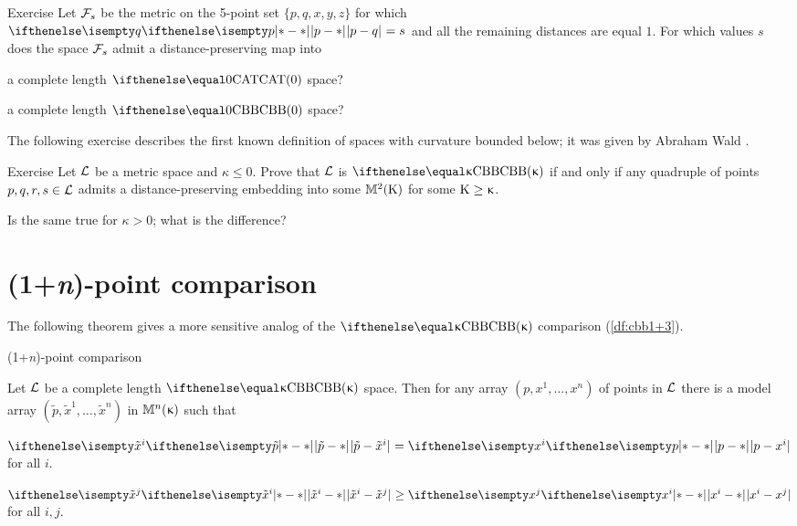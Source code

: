 \begin{thm}{Exercise}\label{ex:5-point-CBA=>CBB}
Let $\mathcal{F}_s$ be the metric
on the 5-point set $\{p,q,x,y,z\}$ for which $\dist{p}{q}{}=s$
and all the remaining distances are equal $1$.
For which values $s$ does the space $\mathcal{F}_s$ admit a distance-preserving map into 
\begin{subthm}{}
a complete length $\CAT{0}$ space?
\end{subthm}
\begin{subthm}{}
a complete length $\Alex{0}$ space?
\end{subthm}
\end{thm}

The following exercise describes the first known definition of spaces with curvature bounded below;
it was given by Abraham Wald \cite{wald}. 

\begin{thm}{Exercise}\label{ex:cbb-wald}
Let $\mathcal{L}$ be a metric space and $\kappa\le 0$.
Prove that $\mathcal{L}$ is $\Alex\kappa$ if and only if  any quadruple of points $p,q,r,s\in \spc{L}$ admits a distance-preserving embedding into some $\mathbb{M}_{{}}^{2}({\mathrm{K}})$ for some $\Kappa\ge\kappa$.

Is the same true for $\kappa>0$; what is the difference?
\end{thm}

\section{(1+\textit{n})-point comparison}\label{sec:1+n}

The following theorem gives a more sensitive analog of the $\Alex\kappa$ comparison (\ref{df:cbb1+3}).

\begin{thm}{(1+\textit{n})-point comparison}
\label{thm:pos-config} {\sloppy 
Let $\mathcal{L}$ be a complete length $\Alex{\kappa}$ space.
Then for any array $(p,x^1,\dots,x^n)$ of points  in $\mathcal{L}$  
there is a model array $(\tilde p,\tilde x^1,\dots,\tilde x^n)$ in $\mathbb{M}_{{}}^{n}({\upkappa})$ such that

}

\begin{subthm}{}
$\dist{\tilde p}{\tilde x^i}{}=\dist{p}{x^i}{}$ for all $i$.
\end{subthm}

\begin{subthm}{}$\dist{\tilde x^i}{\tilde x^j}{}\ge\dist{x^i}{x^j}{}$ for all $i,j$.
\end{subthm}
\end{thm}

